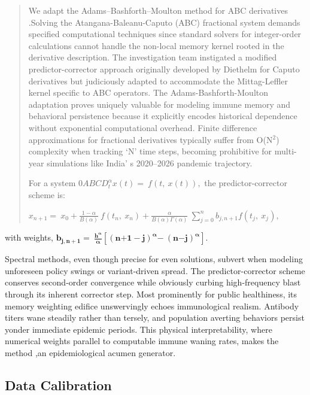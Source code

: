 \documentclass[10pt]{NSP1}
\begin{document}
\begin{quote}
We adapt the Adams--Bashforth--Moulton method for ABC derivatives \cite{ref59}.Solving the Atangana-Baleanu-Caputo (ABC) fractional system demands specified computational techniques since standard solvers for integer-order calculations cannot handle the non-local memory kernel rooted in the derivative description. The investigation team instigated a modified predictor-corrector approach originally developed by Diethelm for Caputo derivatives but judiciously adapted to accommodate the Mittag-Leffler kernel specific to ABC operators. The Adams-Bashforth-Moulton adaptation proves uniquely valuable for modeling immune memory and behavioral persistence because it explicitly encodes historical dependence without exponential computational overhead. Finite difference approximations for fractional derivatives typically suffer from O(N$^2$) complexity when tracking `N' time steps, becoming prohibitive for multi-year simulations like India' s 2020--2026 pandemic trajectory.

For a system \({0ABCD}_{t}^{\alpha}x(t) = \ f\left( t,\ x(t) \right),\) the predictor-corrector scheme is:

\(x_{n + 1} = \ x_{0} + \frac{1 - \alpha}{B(\alpha)}\ f\left( t_{n},\ x_{n} \right) + \frac{\alpha}{B(\alpha)\Gamma(\alpha)}\ \sum_{j = 0}^{n}{}b_{j,n + 1}f\left( t_{j},\ x_{j} \right),\)
\end{quote}

with weights, \(\mathbf{b}_{\mathbf{j,n + 1}}\mathbf{= \ }\frac{\mathbf{h}^{\mathbf{\alpha}}}{\mathbf{\alpha}}\left\lbrack \left( \mathbf{n}\mathbf{+ 1 -}\mathbf{j} \right)^{\mathbf{\alpha}}\mathbf{-\ }\left( \mathbf{n}\mathbf{-}\mathbf{j} \right)^{\mathbf{\alpha}} \right\rbrack\mathbf{.}\)

Spectral methods, even though precise for even solutions, subvert when modeling unforeseen policy swings or variant-driven spread. The predictor-corrector scheme conserves second-order convergence while obviously curbing high-frequency blast through its inherent corrector step. Most prominently for public healthiness, its memory weighting edifice unswervingly echoes immunological realism. Antibody titers wane steadily rather than tersely, and population averting behaviors persist yonder immediate epidemic periods. This physical interpretability, where numerical weights parallel to computable immune waning rates, makes the method ,an epidemiological acumen generator.

\subsection{Data Calibration}
\end{document}
